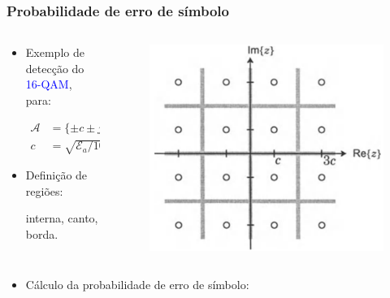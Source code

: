 \begin{frame}
	\frametitle{Probabilidade de erro de símbolo}

	\begin{columns}
		\begin{column}{0.6\textwidth}
		    \begin{itemize}
			\item Exemplo de detecção do \textcolor{blue}{16-QAM}, para:
			\begin{footnotesize}
			\begin{align*}
			    \mathcal{A} &=\{\pm c \pm jc, \pm c \pm j3c, \pm 3c \pm jc, \pm 3c \pm j3c  \} \\ 
			    c &=\sqrt{\mathcal{E}_a/10}
			\end{align*}		
			\end{footnotesize}
			\item Definição de regiões: \begin{footnotesize}interna, canto, borda.\end{footnotesize}
		    \end{itemize}
		\end{column}
		\begin{column}{0.4\textwidth}
		    \begin{figure}[t]	
		    \begin{center}
			\includegraphics[width=0.8\columnwidth]{figs/pam_46}
		    \end{center}
		    \end{figure}
		\end{column}
	\end{columns}	
	\begin{itemize}
	    \item Cálculo da probabilidade de erro de símbolo:	    

\end{itemize}
\end{frame}
